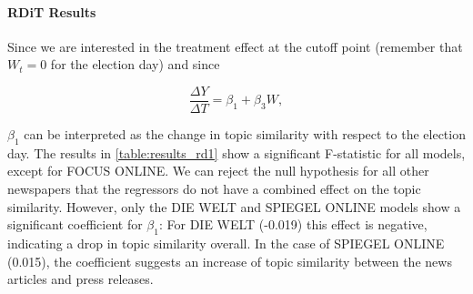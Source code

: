 \documentclass[
  12pt,
]{article}
\begin{document}
\hypertarget{rdit-results}{%
\paragraph{RDiT Results}\label{rdit-results}}

Since we are interested in the treatment effect at the cutoff point
(remember that \(W_t=0\) for the election day) and since

\[
\frac{\Delta Y}{\Delta T}=\beta_1+\beta_3W,
\]

\(\beta_1\) can be interpreted as the change in topic similarity with
respect to the election day. The results in \autoref{table:results_rd1}
show a significant F-statistic for all models, except for FOCUS ONLINE.
We can reject the null hypothesis for all other newspapers that the
regressors do not have a combined effect on the topic similarity.
However, only the DIE WELT and SPIEGEL ONLINE models show a significant
coefficient for \(\beta_1\): For DIE WELT (-0.019) this effect is
negative, indicating a drop in topic similarity overall. In the case of
SPIEGEL ONLINE (0.015), the coefficient suggests an increase of topic
similarity between the news articles and press releases.
\end{document}
